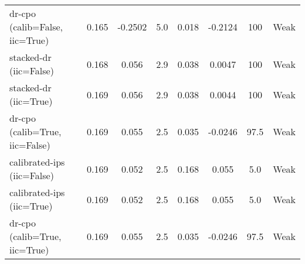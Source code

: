 \begin{table}[htbp]
\begin{tabular}{l|ccccccc}
dr-cpo (calib=False, iic=True) & 0.165 & -0.2502 & 5.0 & 0.018 & -0.2124 & 100 & Weak \\
stacked-dr (iic=False) & 0.168 & 0.056 & 2.9 & 0.038 & 0.0047 & 100 & Weak \\
stacked-dr (iic=True) & 0.169 & 0.056 & 2.9 & 0.038 & 0.0044 & 100 & Weak \\
dr-cpo (calib=True, iic=False) & 0.169 & 0.055 & 2.5 & 0.035 & -0.0246 & 97.5 & Weak \\
calibrated-ips (iic=False) & 0.169 & 0.052 & 2.5 & 0.168 & 0.055 & 5.0 & Weak \\
calibrated-ips (iic=True) & 0.169 & 0.052 & 2.5 & 0.168 & 0.055 & 5.0 & Weak \\
dr-cpo (calib=True, iic=True) & 0.169 & 0.055 & 2.5 & 0.035 & -0.0246 & 97.5 & Weak \\
\bottomrule
\end{tabular}
\end{table}